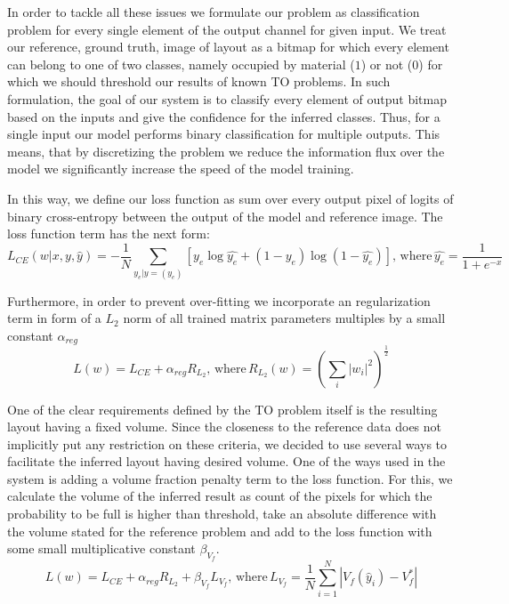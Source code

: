 In order to tackle all these issues we formulate our problem as classification problem for every single element of the output channel for given input. 
We treat our reference, ground truth, image of layout as a bitmap for which every element can belong to one of two classes, namely occupied by material ($1$)  or not ($0$) for which we should threshold our results of known TO problems.
In such formulation, the goal of our system is to classify every element of output bitmap based on the inputs and give the confidence for the inferred classes.
Thus, for a single input our model performs binary classification for multiple outputs.
This means, that by discretizing the problem we reduce the information flux over the model we significantly increase the speed of the model training.
\medskip

In this way, we define our loss function as sum over every output pixel of logits of binary cross-entropy between the output of the model and reference image.
The loss function term has the next form:
\begin{equation}
 L_{CE}(w|x, y, \hat{y}) = -\frac{1}{N} \sum_{y_{e}|y=(y_{e})}^{} [ y_{e} \log \hat{y_{e}} + (1-y_{e}) \log (1-\hat{y_{e}})] , \, \mathrm{where} \, \hat{y_{e}} = \frac{1}{1+e^{-x}} 
\end{equation}
\medskip

Furthermore, in order to prevent over-fitting we incorporate an regularization term in form of a $L_{2}$ norm of all trained matrix parameters multiples by a small constant $\alpha_{reg}$
\begin{equation}
 	L(w) = L_{CE} + \alpha_{reg} R_{L_{2}}, \, \mathrm{where} \, R_{L_{2}}(w) = ( \sum_{i}^{} |w_{i}|^{2} )^{\frac{1}{2}} 
\end{equation}
\medskip

One of the clear requirements defined by the TO problem itself is the resulting layout having a fixed volume. 
Since the closeness to the reference data does not implicitly put any restriction on these criteria, we decided to use several ways to facilitate the inferred layout having desired volume.
One of the ways used in the system is adding a volume fraction penalty term to the loss function.
For this, we calculate the volume of the inferred result as count of the pixels for which the probability to be full is higher than threshold, take an absolute difference with the volume stated for the reference problem and add to the loss function with some small multiplicative constant $\beta_{V_{f}}$.
\begin{equation}
	L(w) = L_{CE} + \alpha_{reg} R_{L_{2}} + \beta_{V_{f}}  L_{V_{f}} , \, \mathrm{where} \, L_{V_{f}} = \frac{1}{N} \sum_{i=1}^{N} |V_{f}(\hat{y}_{i}) - V_{f}^{\ast}|
\end{equation}

